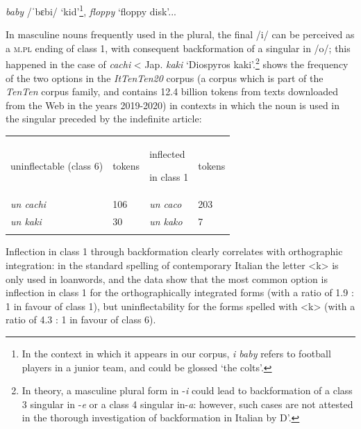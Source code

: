 \documentclass[output=paper]{langscibook}
\begin{document}
         \textit{baby} /ˈbɛbi/ ‘kid’\footnote{In the context in which it appears in our corpus, \textit{i baby} refers to football players in a junior team, and could be glossed ‘the colts’.}, \textit{floppy} ‘floppy disk’...

In masculine nouns frequently used in the plural, the final /i/ can be perceived as a \textsc{m.pl} ending of class 1, with consequent backformation of a singular in /o/; this happened in the case of \textit{cachi} < Jap. \textit{kaki} ‘Diospyros kaki’.\footnote{In theory, a masculine plural form in \nobreakdash-\textit{i} could lead to backformation of a class 3 singular in \nobreakdash-\textit{e} or a class 4 singular in\nobreakdash-\textit{a}: however, such cases are not attested in the thorough investigation of backformation in Italian by D’\citet{Achille2005b}.}   shows the frequency of the two options in the \textit{ItTenTen20} corpus (a corpus which is part of the \textit{TenTen} corpus family, and contains 12.4 billion tokens from texts downloaded from the Web in the years 2019-2020) in contexts in which the noun is used in the singular preceded by the indefinite article:

\begin{table}
\caption{Inflectional forms of singular \textit{cachi / kaki} in \textit{ItTenTen20}}
\label{tab:key:10}
\end{table}


\begin{tabularx}{\textwidth}{XXXX}

\lsptoprule

uninflectable (class 6) & tokens & inflected 

in class 1 & tokens\\
\textit{un cachi}  & 106 & \textit{un caco} & 203\\
\textit{un kaki} & 30 & \textit{un kako} & 7\\
\lspbottomrule
\end{tabularx}
Inflection in class 1 through backformation clearly correlates with orthographic integration: in the standard spelling of contemporary Italian the letter <k> is only used in loanwords, and the data show that the most common option is inflection in class 1 for the orthographically integrated forms (with a ratio of 1.9 : 1 in favour of class 1), but uninflectability for the forms spelled with <k> (with a ratio of 4.3 : 1 in favour of class 6).
\end{document}

